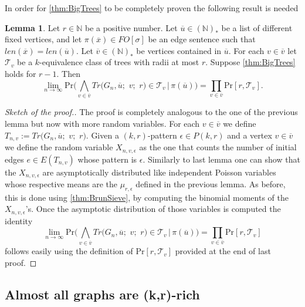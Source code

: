 \documentclass[12pt,notitlepage,a4paper]{article}
\theoremstyle{definition}
\newtheorem{lemma}{Lemma}[section]
\newcommand{\N}{\mathbb{N}}
\newcommand{\Ln}{\lim\limits_{n\to \infty}}
\begin{document}
	In order for \cref{thm:BigTrees} to be completely proven the following result is needed
	
	\begin{lemma}
		Let $r\in \N$ be a positive number.
		Let $\overline{u}\in (\N)_*$ be a list of different fixed 
		vertices, and let $\pi(\overline{x})\in FO[\sigma]$ be an
		edge sentence such that 
		$len(\overline{x})=len(\overline{u})$.
		Let $\overline{v}\in (\N)_*$ be vertices contained
		in $\overline{u}$. For each $v\in \overline{v}$
		let $\mathcal{T}_v$ be a $k$-equivalence class
		of trees with radii	at most $r$. Suppose
		\cref{thm:BigTrees} holds for $r-1$. Then
		\[
		\Ln \mathrm{Pr}\big( \bigwedge_{v\in \overline{v}} 
		Tr\big(G_n, \overline{u};\,\,v;\,\,r\big)\in \mathcal{T}_v 
		\, | \, \pi(\overline{u})
		\big)= \prod_{v\in \overline{v}} \mathrm{Pr}[r,\mathcal{T}_v]. \]	 
	\end{lemma}
	\begin{proof}[Sketch of the proof.]
		The proof is completely analogous to the one 
		of the previous lemma but now with more 
		random variables. For each $v\in \overline{v}$ we define
		$T_{n,v}:=Tr\big(G_n, \overline{u};\,\,v;\,\,r\big)$.
		Given a $(k,r)$-pattern $\epsilon\in P(k,r)$ and a vertex
		$v\in \overline{v}$ we define the random variable 
		$X_{n,v,\epsilon}$ as the one that counts the number of initial
		edges $e\in E(T_{n,v})$ whose pattern is $\epsilon$. Similarly to last lemma
		one can show that the $X_{n,v,\epsilon}$ are asymptotically distributed
		like independent Poisson variables whose respective means are the
		$\mu_{r,\epsilon}$ defined in the previous lemma. As before, this is done using 
		\cref{thm:BrunSieve}, by computing the binomial moments of the $X_{n,v,\epsilon}$'s.
		Once the asymptotic distribution of those variables is computed the identity
		\[\Ln \mathrm{Pr}\big( \bigwedge_{v\in \overline{v}} 
		Tr\big(G_n, \overline{u};\,\,v;\,\,r\big)\in \mathcal{T}_v 
		\, | \, \pi(\overline{u})
		\big)= \prod_{v\in \overline{v}} \mathrm{Pr}[r,\mathcal{T}_v]
		\]
		follows easily using the definition of $\mathrm{Pr}[r,\mathcal{T}_v]$ 
		provided at the end of last proof. 
	\end{proof}

	\subsection{Almost all graphs are (k,r)-rich}
	
\end{document}
